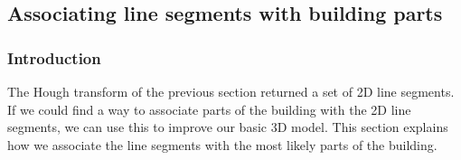 \documentclass[10pt]{article}
\begin{document}
\subsection{Associating line segments with building parts}
%
% 
% 

	\subsubsection{Introduction}
	The Hough transform of the previous section returned a set of 2D line
	segments.  If we could find a way to associate parts of the building with
	the 2D line segments, we can use this to improve our basic 3D model.
	This section explains how we associate the line segments with the most
	likely parts of the building. \\
\end{document}
